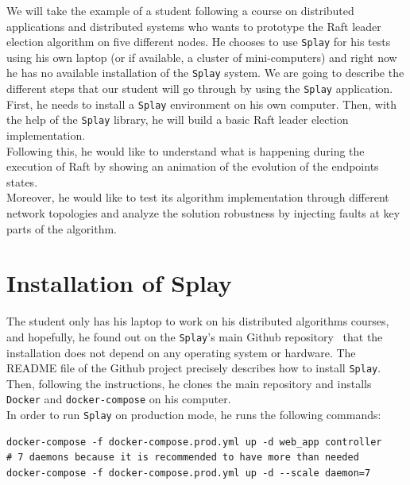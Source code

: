 \documentclass{eplmastersthesis}
\begin{document}
    We will take the example of a student following a course on distributed
    applications and distributed systems who wants to prototype the Raft
    leader election algorithm on five different nodes. He chooses to use
    \texttt{Splay} for his tests using his own laptop (or if available, a cluster
    of mini-computers) and right now he has no available installation of the
    \texttt{Splay} system. We are going to describe the different steps that our
    student will go through by using the \texttt{Splay} application.\\

    First, he needs to install a \texttt{Splay} environment on his own computer. Then,
    with the help of the \texttt{Splay} library, he will build a basic Raft leader
    election implementation.\\
    Following this, he would like to understand what is happening during the
    execution of Raft by showing an animation of the evolution of the
    endpoints states.\\
    Moreover, he would like to test its algorithm implementation through
    different network topologies and analyze the solution
    robustness by injecting faults at key parts of the algorithm.

    \section{Installation of Splay}

      The student only has his laptop to work on his distributed algorithms
      courses, and hopefully, he found out on the \texttt{Splay}'s main Github
      repository~\cite{SplayV2Git} that the installation does not depend on
      any operating system or hardware. The README file of the Github project
      precisely describes how to install \texttt{Splay}. Then, following the
      instructions, he clones the main repository and installs \texttt{Docker} and
      \texttt{docker-compose} on his computer.\\
      In order to run \texttt{Splay} on production mode, he runs the following
      commands: \\

      \begin{lstlisting}[style=MyBash]
docker-compose -f docker-compose.prod.yml up -d web_app controller
# 7 daemons because it is recommended to have more than needed
docker-compose -f docker-compose.prod.yml up -d --scale daemon=7
      \end{lstlisting}
\end{document}
